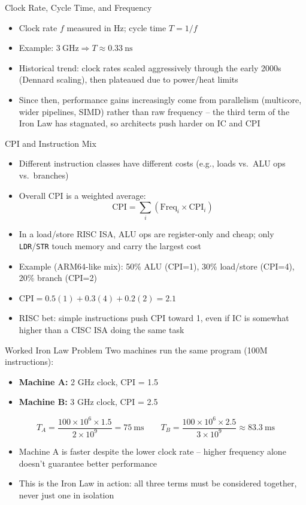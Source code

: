 \documentclass[10pt, aspectratio=169]{beamer}
\begin{document}
\begin{frame}{Clock Rate, Cycle Time, and Frequency}
\begin{itemize}
    \item Clock rate $f$ measured in Hz; cycle time $T = 1/f$
    \item Example: $3\ \text{GHz} \Rightarrow T \approx 0.33\ \text{ns}$
    \item Historical trend: clock rates scaled aggressively through the early 2000s (Dennard scaling), then plateaued due to power/heat limits
    \item Since then, performance gains increasingly come from parallelism (multicore, wider pipelines, SIMD) rather than raw frequency -- the third term of the Iron Law has stagnated, so architects push harder on IC and CPI
\end{itemize}
\end{frame}

\begin{frame}{CPI and Instruction Mix}
\begin{itemize}
    \item Different instruction classes have different costs (e.g., loads vs.\ ALU ops vs.\ branches)
    \item Overall CPI is a weighted average:
    \[
    \text{CPI} = \sum_{i} \left( \text{Freq}_i \times \text{CPI}_i \right)
    \]
    \item In a load/store RISC ISA, ALU ops are register-only and cheap; only \texttt{LDR}/\texttt{STR} touch memory and carry the largest cost
    \item Example (ARM64-like mix): 50\% ALU (CPI=1), 30\% load/store (CPI=4), 20\% branch (CPI=2)
    \item $\text{CPI} = 0.5(1) + 0.3(4) + 0.2(2) = 2.1$
    \item RISC bet: simple instructions push CPI toward 1, even if IC is somewhat higher than a CISC ISA doing the same task
\end{itemize}
\end{frame}

\begin{frame}{Worked Iron Law Problem}
Two machines run the same program (100M instructions):
\begin{itemize}
    \item \textbf{Machine A:} 2 GHz clock, CPI = 1.5
    \item \textbf{Machine B:} 3 GHz clock, CPI = 2.5
\end{itemize}
\[
T_A = \frac{100\times10^6 \times 1.5}{2\times10^9} = 75\ \text{ms}
\qquad
T_B = \frac{100\times10^6 \times 2.5}{3\times10^9} \approx 83.3\ \text{ms}
\]
\begin{itemize}
    \item Machine A is faster despite the lower clock rate -- higher frequency alone doesn't guarantee better performance
    \item This is the Iron Law in action: all three terms must be considered together, never just one in isolation
\end{itemize}
\end{frame}
\end{document}
